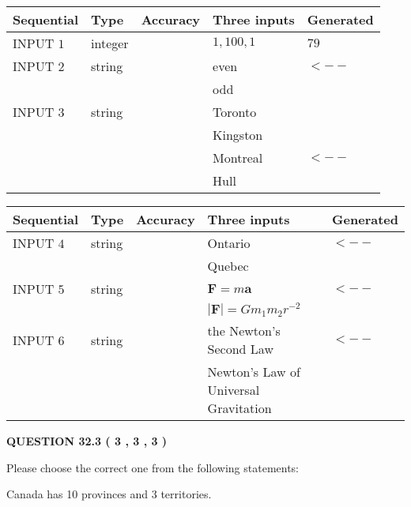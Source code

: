 \documentclass[12pt]{article}
\begin{document}
   
  
  
\noindent\begin{tabular}{|l|l|l|l|l|}
\hline
 Sequential & Type & Accuracy & Three inputs & Generated \\ 
\hline
 
 
  INPUT $            1 $ & integer &  & $
 1
 , 
 100
 , 
 1
 $ & $ 79 $ 
 \\  \hline  
 
 
  INPUT $            2 $ & string & & 
 even & 
  $ <-- $ 
  \\
  & & & 
 odd & 
 \\  \hline  
 
 
  INPUT $            3 $ & string & & 
 Toronto & 
  \\
  & & & 
 Kingston & 
  \\
  & & & 
 Montreal & 
  $ <-- $ 
  \\
  & & & 
 Hull & 
 \\  \hline  
 \end{tabular}
   
   
  
  
\noindent\begin{tabular}{|l|l|l|l|l|}
\hline
 Sequential & Type & Accuracy & Three inputs & Generated \\ 
\hline
 
 
  INPUT $            4 $ & string & & 
 Ontario & 
  $ <-- $ 
  \\
  & & & 
 Quebec & 
 \\  \hline  
 
 
  INPUT $            5 $ & string & & 
 $\mathbf{F}=m\mathbf{a}$ & 
  $ <-- $ 
  \\
  & & & 
 $\left| \mathbf{F}\right| =Gm_1m_2r^{-2}$ & 
 \\  \hline  
 
 
  INPUT $            6 $ & string & & 
 the Newton's Second Law & 
  $ <-- $ 
  \\
  & & & 
 Newton's Law of Universal Gravitation & 
 \\  \hline  
 \end{tabular}
   
   
  
\vspace{0.2in}
  
{\textbf{\Large{QUESTION
32.3 
 (           3 ,           3 ,           3 )
}}}
  
  
Please choose the correct one from the following statements:
 
 
Canada has  %
10 provinces and  %
3 territories.
 
\end{document}

